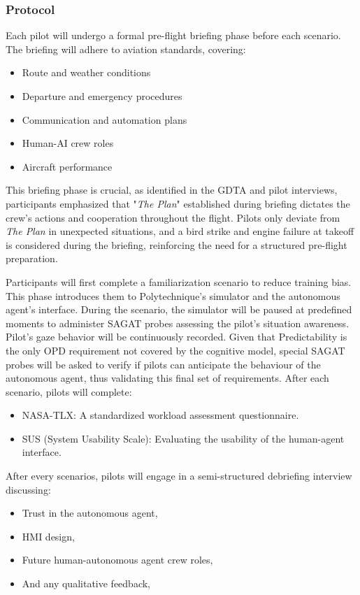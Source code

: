 \documentclass[12pt,a4paper]{article} %
\begin{document}
	\subsubsection{Protocol}
	Each pilot will undergo a formal pre-flight briefing phase before each scenario. The briefing will adhere to aviation standards, covering:
	\begin{itemize}
		\item Route and weather conditions
		\item Departure and emergency procedures
		\item Communication and automation plans
		\item Human-AI crew roles
		\item Aircraft performance 
	\end{itemize}
	This briefing phase is crucial, as identified in the GDTA and pilot interviews, participants emphasized that "\textit{The Plan}" established during briefing dictates the crew's actions and cooperation throughout the flight. Pilots only deviate from \textit{The Plan} in unexpected situations, and a bird strike and engine failure at takeoff is considered during the briefing, reinforcing the need for a structured pre-flight preparation.

	Participants will first complete a familiarization scenario to reduce training bias. This phase introduces them to Polytechnique's simulator and the autonomous agent's interface. During the scenario, the simulator will be paused at predefined moments to administer SAGAT probes assessing the pilot's situation awareness. Pilot's gaze behavior will be continuously recorded.
	Given that Predictability is the only OPD requirement not covered by the cognitive model, special SAGAT probes will be asked to verify if pilots can anticipate the behaviour of the autonomous agent, thus validating this final set of requirements.
	After each scenario, pilots will complete:

	\begin{itemize}
		\item NASA-TLX: A standardized workload assessment questionnaire.
		\item SUS (System Usability Scale): Evaluating the usability of the human-agent interface. 
	\end{itemize}

	After every scenarios, pilots will engage in a semi-structured debriefing interview discussing:

	\begin{itemize}
		\item Trust in the autonomous agent,
		\item HMI design,
		\item Future human-autonomous agent crew roles,
		\item And any qualitative feedback,
	\end{itemize} 
\end{document}
